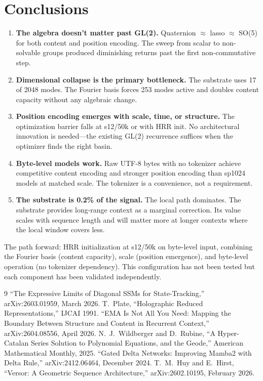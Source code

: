 \documentclass[11pt,a4paper]{article}
\begin{document}
\section{Conclusions}

\begin{enumerate}
\item \textbf{The algebra doesn't matter past GL(2).} Quaternion $\approx$ lasso $\approx$ SO(5) for both content and position encoding. The sweep from scalar to non-solvable groups produced diminishing returns past the first non-commutative step.

\item \textbf{Dimensional collapse is the primary bottleneck.} The substrate uses 17 of 2048 modes. The Fourier basis forces 253 modes active and doubles content capacity without any algebraic change.

\item \textbf{Position encoding emerges with scale, time, or structure.} The optimization barrier falls at s12/50k or with HRR init. No architectural innovation is needed---the existing GL(2) recurrence suffices when the optimizer finds the right basin.

\item \textbf{Byte-level models work.} Raw UTF-8 bytes with no tokenizer achieve competitive content encoding and stronger position encoding than sp1024 models at matched scale. The tokenizer is a convenience, not a requirement.

\item \textbf{The substrate is 0.2\% of the signal.} The local path dominates. The substrate provides long-range context as a marginal correction. Its value scales with sequence length and will matter more at longer contexts where the local window covers less.
\end{enumerate}

The path forward: HRR initialization at s12/50k on byte-level input, combining the Fourier basis (content capacity), scale (position emergence), and byte-level operation (no tokenizer dependency). This configuration has not been tested but each component has been validated independently.

\begin{thebibliography}{9}
 ``The Expressive Limits of Diagonal SSMs for State-Tracking,'' arXiv:2603.01959, March 2026.
 T.~Plate, ``Holographic Reduced Representations,'' IJCAI 1991.
 ``EMA Is Not All You Need: Mapping the Boundary Between Structure and Content in Recurrent Context,'' arXiv:2604.08556, April 2026.
 N.~J.~Wildberger and D.~Rubine, ``A Hyper-Catalan Series Solution to Polynomial Equations, and the Geode,'' American Mathematical Monthly, 2025.
 ``Gated Delta Networks: Improving Mamba2 with Delta Rule,'' arXiv:2412.06464, December 2024.
 T.~M.~Huy and E.~Hirst, ``Versor: A Geometric Sequence Architecture,'' arXiv:2602.10195, February 2026.
\end{thebibliography}
\end{document}
